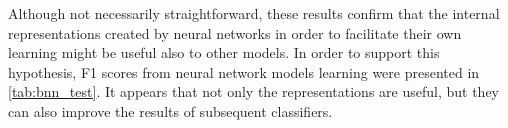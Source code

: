 


\vspace{\baselineskip}
Although not necessarily straightforward, these results confirm that the internal representations created by neural networks in order to facilitate their own learning might be useful also to other models. In order to support this hypothesis, F1 scores from neural network models learning were presented in \autoref{tab:bnn_test}. It appears that not only the representations are useful, but they can also improve the results of subsequent classifiers.

